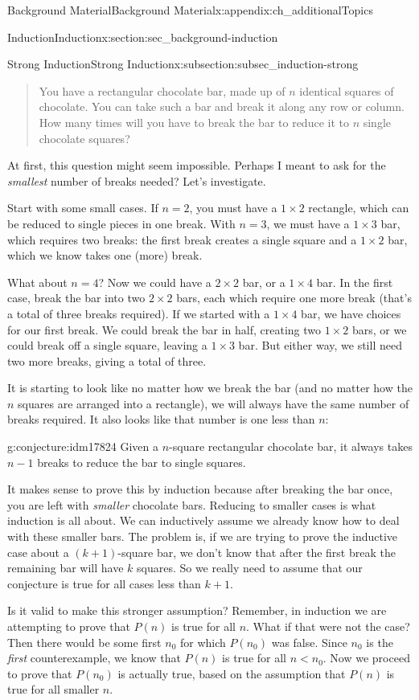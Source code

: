 \documentclass[oneside,10pt,]{book}
\numberwithin{equation}{chapter}
\newcommand{\lt}{<}
\begin{document}
\begin{appendixptx}{Background Material}{}{Background Material}{}{}{x:appendix:ch_additionalTopics}
\begin{sectionptx}{Induction}{}{Induction}{}{}{x:section:sec_background-induction}
\begin{subsectionptx}{Strong Induction}{}{Strong Induction}{}{}{x:subsection:subsec_induction-strong}
\begin{quote}%
You have a rectangular chocolate bar, made up of \(n\) identical squares of chocolate.  You can take such a bar and break it along any row or column.  How many times will you have to break the bar to reduce it to \(n\) single chocolate squares?%
\end{quote}
At first, this question might seem impossible.  Perhaps I meant to ask for the \emph{smallest} number of breaks needed?  Let's investigate.%
\par
Start with some small cases.  If \(n=2\), you must have a \(1\times 2\) rectangle, which can be reduced to single pieces in one break.  With \(n=3\), we must have a \(1\times 3\) bar, which requires two breaks: the first break creates a single square and a \(1\times 2\) bar, which we know takes one (more) break.%
\par
What about \(n=4\)?  Now we could have a \(2\times 2\) bar, or a \(1 \times 4\) bar.  In the first case, break the bar into two \(2\times 2\) bars, each which require one more break (that's a total of three breaks required).  If we started with a \(1 \times 4\) bar, we have choices for our first break.  We could break the bar in half, creating two \(1\times 2\) bars, or we could break off a single square, leaving a \(1\times 3\) bar.  But either way, we still need two more breaks, giving a total of three.%
\par
It is starting to look like no matter how we break the bar (and no matter how the \(n\) squares are arranged into a rectangle), we will always have the same number of breaks required.  It also looks like that number is one less than \(n\):%
\begin{conjecture}{}{}{g:conjecture:idm17824}%
Given a \(n\)-square rectangular chocolate bar, it always takes \(n-1\) breaks to reduce the bar to single squares.%
\end{conjecture}
It makes sense to prove this by induction because after breaking the bar once, you are left with \emph{smaller} chocolate bars.  Reducing to smaller cases is what induction is all about.  We can inductively assume we already know how to deal with these smaller bars.  The problem is, if we are trying to prove the inductive case about a \((k+1)\)-square bar, we don't know that after the first break the remaining bar will have \(k\) squares.  So we really need to assume that our conjecture is true for all cases less than \(k+1\).%
\par
Is it valid to make this stronger assumption?  Remember, in induction we are attempting to prove that \(P(n)\) is true for all \(n\).  What if that were not the case?  Then there would be some first \(n_0\) for which \(P(n_0)\) was false.  Since \(n_0\) is the \emph{first} counterexample, we know that \(P(n)\) is true for all \(n \lt n_0\).  Now we proceed to prove that \(P(n_0)\) is actually true, based on the assumption that \(P(n)\) is true for all smaller \(n\).%

\end{subsectionptx}
\end{sectionptx}
\end{appendixptx}
\end{document}
